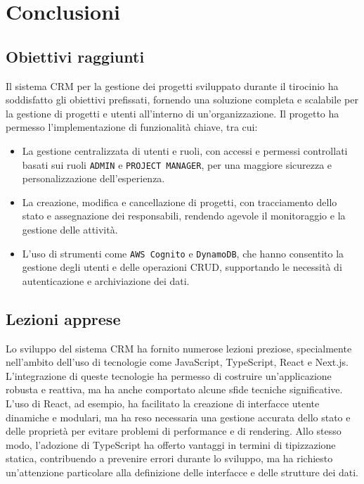 \documentclass[target=bach,aauheader=,style=]{thud}
\begin{document}
\chapter{Conclusioni}

\section{Obiettivi raggiunti}
Il sistema CRM per la gestione dei progetti sviluppato durante il tirocinio ha soddisfatto gli obiettivi prefissati, fornendo una soluzione completa e scalabile per la gestione di progetti e utenti all'interno di un'organizzazione. Il progetto ha permesso l'implementazione di funzionalità chiave, tra cui:
\begin{itemize}
    \item La gestione centralizzata di utenti e ruoli, con accessi e permessi controllati basati sui ruoli \texttt{ADMIN} e \texttt{PROJECT MANAGER}, per una maggiore sicurezza e personalizzazione dell'esperienza.
    \item La creazione, modifica e cancellazione di progetti, con tracciamento dello stato e assegnazione dei responsabili, rendendo agevole il monitoraggio e la gestione delle attività.
    \item L'uso di strumenti come \texttt{AWS Cognito} e \texttt{DynamoDB}, che hanno consentito la gestione degli utenti e delle operazioni CRUD, supportando le necessità di autenticazione e archiviazione dei dati.
\end{itemize}

\section{Lezioni apprese}
Lo sviluppo del sistema CRM ha fornito numerose lezioni preziose, specialmente nell'ambito dell'uso di tecnologie come JavaScript, TypeScript, React e Next.js. L'integrazione di queste tecnologie ha permesso di costruire un'applicazione robusta e reattiva, ma ha anche comportato alcune sfide tecniche significative. L'uso di React, ad esempio, ha facilitato la creazione di interfacce utente dinamiche e modulari, ma ha reso necessaria una gestione accurata dello stato e delle proprietà per evitare problemi di performance e di rendering. Allo stesso modo, l'adozione di TypeScript ha offerto vantaggi in termini di tipizzazione statica, contribuendo a prevenire errori durante lo sviluppo, ma ha richiesto un'attenzione particolare alla definizione delle interfacce e delle strutture dei dati.
\end{document}
